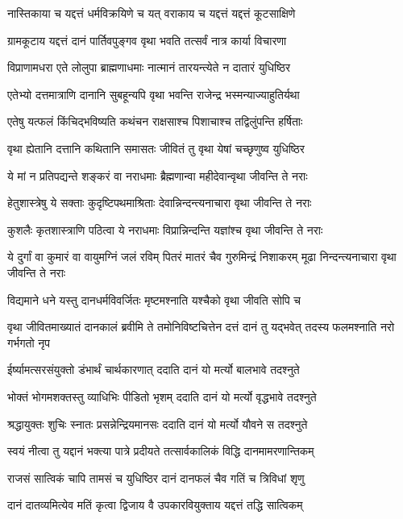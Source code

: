 \twolineshloka
{नास्तिकाया च यद्दत्तं धर्मविक्रयिणे च यत्}
{वराकाय च यद्दत्तं यद्दत्तं कूटसाक्षिणे}


\twolineshloka
{ग्रामकूटाय यद्दत्तं दानं पार्तिवपुङ्गव}
{वृथा भवति तत्सर्वं नात्र कार्या विचारणा}


\twolineshloka
{विप्राणामधरा एते लोलुपा ब्राह्मणाधमाः}
{नात्मानं तारयन्त्येते न दातारं युधिष्ठिर}


\twolineshloka
{एतेभ्यो दत्तमात्राणि दानानि सुबहून्यपि}
{वृथा भवन्ति राजेन्द्र भस्मन्याज्याहुतिर्यथा}


\twolineshloka
{एतेषु यत्फलं किंचिद्भविष्यति कथंचन}
{राक्षसाश्च पिशाचाश्च तद्विलुंपन्ति हर्षिताः}


\twolineshloka
{वृथा ह्येतानि दत्तानि कथितानि समासतः}
{जीवितं तु वृथा येषां चच्छृणुष्व युधिष्ठिर}


\twolineshloka
{ये मां न प्रतिपद्यन्ते शङ्करं वा नराधमाः}
{ब्रैह्मणान्वा महीदेवान्वृथा जीवन्ति ते नराः}


\twolineshloka
{हेतुशास्त्रेषु ये सक्ताः कुदृष्टिपथमाश्रिताः}
{देवान्निन्दन्त्यनाचारा वृथा जीवन्ति ते नराः}


\twolineshloka
{कुशलैः कृतशास्त्राणि पठित्वा ये नराधमाः}
{विप्रान्निन्दन्ति यज्ञांश्च वृथा जीवन्ति ते नराः}


\threelineshloka
{ये दुर्गां वा कुमारं वा वायुमग्निं जलं रविम्}
{पितरं मातरं चैव गुरुमिन्द्रं निशाकरम्}
{मूढा निन्दन्त्यनाचारा वृथा जीवन्ति ते नराः}


\twolineshloka
{विद्यमाने धने यस्तु दानधर्मविवर्जितः}
{मृष्टमश्नाति यश्चैको वृथा जीवति सोपि च}


वृथा जीवितमाख्यातं दानकालं ब्रवीमि ते
\twolineshloka
{तमोनिविष्टचित्तेन दत्तं दानं तु यद्भवेत्}
{तदस्य फलमश्नाति नरो गर्भगतो नृप}


\twolineshloka
{ईर्ष्यामत्सरसंयुक्तो डंभार्थं चार्थकारणात्}
{ददाति दानं यो मर्त्यो बालभावे तदश्नुते}


\twolineshloka
{भोक्तं भोगमशक्तस्तु व्याधिभिः पीडितो भृशम्}
{ददाति दानं यो मर्त्यो वृद्धभावे तदश्नुते}


\twolineshloka
{श्रद्धायुक्तः शुचिः स्नातः प्रसन्नेन्द्रियमानसः}
{ददाति दानं यो मर्त्यो यौवने स तदश्नुते}


\twolineshloka
{स्वयं नीत्वा तु यद्दानं भक्त्या पात्रे प्रदीयते}
{तत्सार्वकालिकं विद्धि दानमामरणान्तिकम्}


\twolineshloka
{राजसं सात्विकं चापि तामसं च युधिष्ठिर}
{दानं दानफलं चैव गतिं च त्रिविधां शृणु}


\twolineshloka
{दानं दातव्यमित्येव मतिं कृत्वा द्विजाय वै}
{उपकारवियुक्ताय यद्दत्तं तद्धि सात्विकम्}


